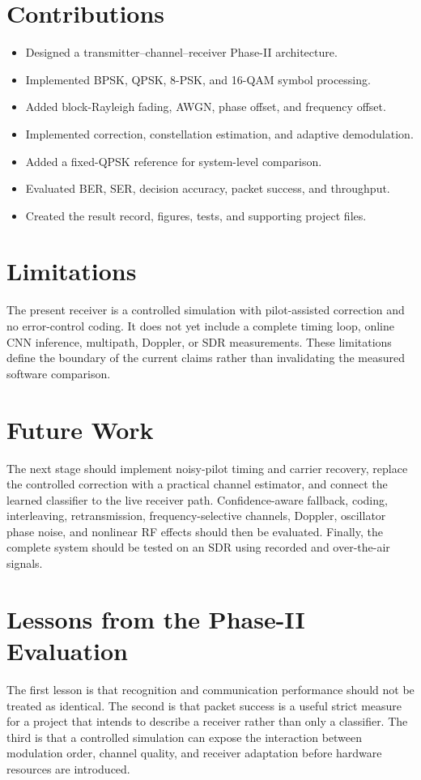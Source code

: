 \documentclass[12pt,twoside,openright]{report}
\begin{document}
\section{Contributions}
\begin{itemize}
\item Designed a transmitter--channel--receiver Phase-II architecture.
\item Implemented BPSK, QPSK, 8-PSK, and 16-QAM symbol processing.
\item Added block-Rayleigh fading, AWGN, phase offset, and frequency offset.
\item Implemented correction, constellation estimation, and adaptive
      demodulation.
\item Added a fixed-QPSK reference for system-level comparison.
\item Evaluated BER, SER, decision accuracy, packet success, and throughput.
\item Created the result record, figures, tests, and supporting project files.
\end{itemize}

\section{Limitations}
The present receiver is a controlled simulation with pilot-assisted
correction and no error-control coding. It does not yet include a complete
timing loop, online CNN inference, multipath, Doppler, or SDR measurements.
These limitations define the boundary of the current claims rather than
invalidating the measured software comparison.

\section{Future Work}
The next stage should implement noisy-pilot timing and carrier recovery,
replace the controlled correction with a practical channel estimator, and
connect the learned classifier to the live receiver path. Confidence-aware
fallback, coding, interleaving, retransmission, frequency-selective
channels, Doppler, oscillator phase noise, and nonlinear RF effects should
then be evaluated. Finally, the complete system should be tested on an SDR
using recorded and over-the-air signals.

\section{Lessons from the Phase-II Evaluation}
The first lesson is that recognition and communication performance should
not be treated as identical. The second is that packet success is a useful
strict measure for a project that intends to describe a receiver rather than
only a classifier. The third is that a controlled simulation can expose the
interaction between modulation order, channel quality, and receiver
adaptation before hardware resources are introduced.
\end{document}
